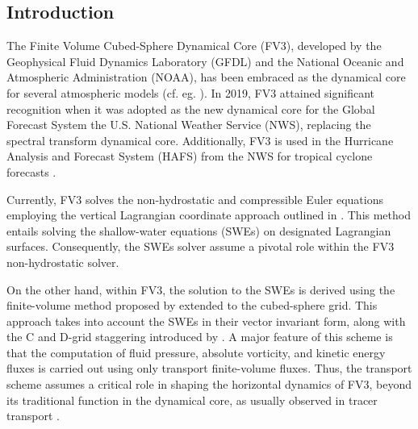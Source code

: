 \documentclass[preprint,12pt]{elsarticle}
\begin{document}
\begin{linenumbers}



\section{Introduction}
\label{intro}
The Finite Volume Cubed-Sphere Dynamical Core (FV3), developed by the Geophysical Fluid Dynamics Laboratory (GFDL) and the National Oceanic and Atmospheric Administration (NOAA), 
has been embraced as the dynamical core for several atmospheric models (cf. eg. \cite{zhou:2015,lee:2020, bertrand:2020,harris:2020,martin:2022,zhang:2024}).
In 2019, FV3 attained significant recognition when it was adopted as the new dynamical core for the Global Forecast System the U.S. National Weather Service (NWS), replacing the spectral transform dynamical core.
Additionally, FV3 is used in the Hurricane Analysis and Forecast System (HAFS) from the NWS for tropical cyclone forecasts \cite{dong:2020}.


Currently, FV3 solves the non-hydrostatic and compressible Euler equations employing the vertical Lagrangian coordinate approach outlined in \cite{lin:2004}.
This method entails solving the shallow-water equations (SWEs) on designated Lagrangian surfaces. 
Consequently, the SWEs solver assume a pivotal role within the FV3 non-hydrostatic solver.

On the other hand, within FV3, the solution to the SWEs is derived using the finite-volume method proposed by \cite{lin:1997} extended to the cubed-sphere grid.
This approach takes into account the SWEs in their vector invariant form, along with the C and D-grid staggering introduced by \cite{arakawa:1977}.
A major feature of this scheme is that the computation of fluid pressure, absolute vorticity, and kinetic energy fluxes is carried out using only transport finite-volume fluxes. 
Thus, the transport scheme assumes a critical role in shaping the horizontal dynamics of FV3, beyond its traditional function in the dynamical core, as usually observed in tracer transport \cite{will:2007}.



\end{linenumbers}
\end{document}

